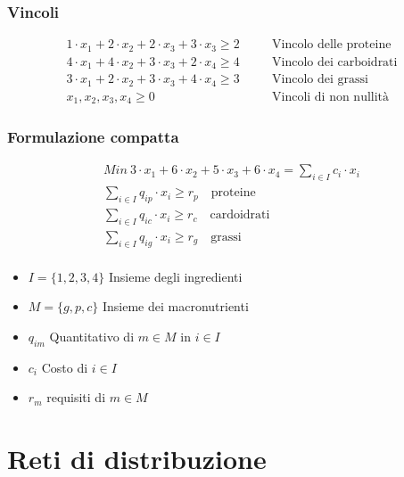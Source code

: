 \subsubsection{Vincoli}
$$
    \begin{aligned}
        1 \cdot x_1 + 2 \cdot x_2 + 2 \cdot x_3 + 3 \cdot x_3 \geq 2 && \quad \text{Vincolo delle proteine} \\ 
        4 \cdot x_1 + 4 \cdot x_2 + 3 \cdot x_3 + 2 \cdot x_4 \geq 4 && \quad \text{Vincolo dei carboidrati} \\
        3 \cdot x_1 + 2 \cdot x_2 + 3 \cdot x_3 + 4 \cdot x_4 \geq 3 && \quad \text{Vincolo dei grassi} \\
        x_1,x_2,x_3,x_4 \geq 0 && \quad \text{Vincoli di non nullità}
    \end{aligned}
$$

\subsubsection{Formulazione compatta}
\begin{minipage}{0.5\textwidth}
    \begin{gather*}
            Min\ 3 \cdot x_1 + 6 \cdot x_2 + 5 \cdot x_3 + 6 \cdot x_4 = \sum_{i \in I} c_i \cdot x_i \\ 
            \sum_{i\in I} q_{ip} \cdot x_i \geq r_p \quad \text{proteine} \\
            \sum_{i\in I} q_{ic} \cdot x_i \geq r_c \quad \text{cardoidrati} \\
            \sum_{i\in I} q_{ig} \cdot x_i \geq r_g \quad \text{grassi} \\
    \end{gather*}
\end{minipage}
\hfill
\begin{minipage}{0.5\textwidth}
    \begin{itemize}
        \item $I = \{1,2,3,4\}$ Insieme degli ingredienti
        \item $M = \{g,p,c\}$ Insieme dei macronutrienti
        \item $q_{im}$ Quantitativo di $m \in M$ in $i \in I$
        \item $c_i$ Costo di $i \in I$
        \item $r_m$ requisiti di $m \in M$
    \end{itemize}
\end{minipage}

\newpage
\section{Reti di distribuzione}
